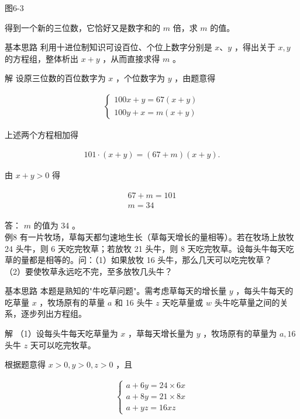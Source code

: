 \documentclass[10pt]{article}
\begin{document}
图6-3

得到一个新的三位数，它恰好又是数字和的 $m$ 倍，求 $m$ 的值。

基本思路 利用十进位制知识可设百位、个位上数字分别是 $x 、 y$ ，得出关于 $x, y$ 的方程组，整体析出 $x+y$ ，从而直接求得 $m$ 。

解 设原三位数的百位数字为 $x$ ，个位数字为 $y$ ，由题意得

\begin{align*}
\left\{\begin{array}{l}
100 x+y=67(x+y) \\
100 y+x=m(x+y)
\end{array}\right.
\end{align*}

上述两个方程相加得

\begin{align*}
101 \cdot(x+y)=(67+m)(x+y) .
\end{align*}

由 $x+y>0$ 得

\begin{align*}
\begin{gathered}
67+m=101 \\
m=34
\end{gathered}
\end{align*}

答： $m$ 的值为 34 。\\
例8 有一片牧场，草每天都匀速地生长（草每天增长的量相等）。若在牧场上放牧 24 头牛，则 6 天吃完牧草；若放牧 21 头牛，则 8 天吃完牧草。设每头牛每天吃草的量都是相等的。问：（1）如果放牧 16 头牛，那么几天可以吃完牧草？\\
（2）要使牧草永远吃不完，至多放牧几头牛？

基本思路 本题是熟知的"牛吃草问题"。需考虑草每天的增长量 $y$ ，每头牛每天的吃草量 $x$ ，牧场原有的草量 $a$ 和 16 头牛 $z$ 天吃草量或 $w$ 头牛吃草量之间的关系，逐步列出方程组。

解 （1）设每头牛每天吃草量为 $x$ ，草每天增长量为 $y$ ，牧场原有的草量为 $a, 16$ 头牛 $z$ 天可以吃完牧草。

根据题意得 $x>0, y>0, z>0$ ，且

\begin{align*}
\left\{\begin{array}{l}
a+6 y=24 \times 6 x  \tag{1}\\
a+8 y=21 \times 8 x \\
a+y z=16 x z
\end{array}\right.
\end{align*}
\end{document}

